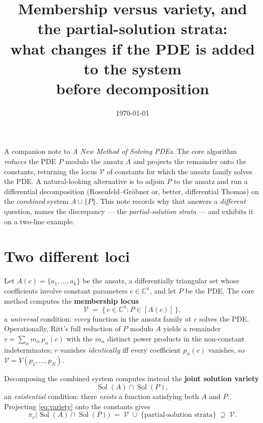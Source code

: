 \documentclass[11pt]{article}
\title{Membership versus variety, and the partial-solution strata:\\
       what changes if the PDE is added to the system\\ before
       decomposition}
\author{}
\date{\today}
\newcommand{\Var}{\mathcal{V}}
\DeclareMathOperator{\Sol}{Sol}
\begin{document}
\maketitle

\noindent
A companion note to \emph{A New Method of Solving PDEs}. The core algorithm
\emph{reduces} the PDE $P$ modulo the ansatz $A$ and projects the remainder
onto the constants, returning the locus $\Var$ of constants for which the
ansatz family solves the PDE. A natural-looking alternative is to adjoin $P$
to the ansatz and run a differential decomposition (Rosenfeld--Gr\"obner or,
better, differential Thomas) on the \emph{combined} system $A \cup \{P\}$.
This note records why that answers a \emph{different} question, names the
discrepancy --- the \emph{partial-solution strata} --- and exhibits it on a
two-line example.

\section{Two different loci}

Let $A(c) = \{a_1, \dots, a_k\}$ be the ansatz, a differentially triangular
set whose coefficients involve constant parameters $c \in \mathbb{C}^n$, and
let $P$ be the PDE. The core method computes the \textbf{membership locus}
%
\begin{equation}
\label{eq:membership}
\Var \;=\; \{\, c \in \mathbb{C}^n : P \in [A(c)] \,\},
\end{equation}
%
a \emph{universal} condition: \emph{every} function in the ansatz family at
$c$ solves the PDE. Operationally, Ritt's full reduction of $P$ modulo $A$
yields a remainder $r = \sum_\alpha m_\alpha\, p_\alpha(c)$ with the $m_\alpha$
distinct power products in the non-constant indeterminates; $r$ vanishes
\emph{identically} iff every coefficient $p_\alpha(c)$ vanishes, so
$\Var = V(p_1, \dots, p_N)$.

Decomposing the combined system computes instead the \textbf{joint solution
variety}
%
\begin{equation}
\label{eq:variety}
\Sol(A) \cap \Sol(P),
\end{equation}
%
an \emph{existential} condition: there \emph{exists} a function satisfying both
$A$ and $P$. Projecting \eqref{eq:variety} onto the constants gives
%
\begin{equation}
\label{eq:overcount}
\pi_c\big(\Sol(A) \cap \Sol(P)\big)
   \;=\; \Var \;\cup\; \{\text{partial-solution strata}\}
   \;\supseteq\; \Var .
\end{equation}
\end{document}
